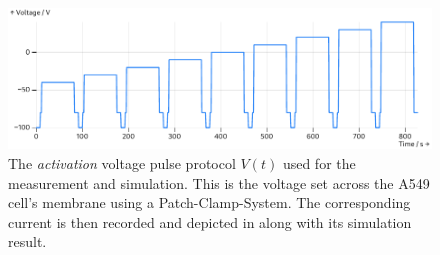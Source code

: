 \begin{figure}
  \includegraphics[width=\columnwidth]{../figures/results/voltage-protocol.pdf}
  \caption{The \textit{activation} voltage pulse protocol $V(t)$ used for the measurement and simulation. This is the voltage set across the A549 cell's membrane using a Patch-Clamp-System. The corresponding current is then recorded and depicted in  along with its simulation result.}
  \label{figure:voltage-protocol}
\end{figure}
